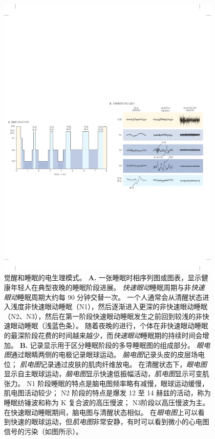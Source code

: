 \begin{figure}[htbp]
	\centering
	\includegraphics[width=1.0\linewidth]{chap44/fig_44_1}
	\caption{觉醒和睡眠的电生理模式。
		\textbf{A.} 一张睡眠时相序列图或图表，显示健康年轻人在典型夜晚的睡眠阶段进展。
		\textit{快速眼动}睡眠周期与非\textit{快速眼动}睡眠周期大约每 90 分钟交替一次。
		一个人通常会从清醒状态进入浅度非快速眼动睡眠（N1），然后逐渐进入更深的非快速眼动睡眠（N2、N3），然后在第一阶段快速眼动睡眠发生之前回到较浅的非快速眼动睡眠（浅蓝色条）。
		随着夜晚的进行，个体在非快速眼动睡眠的最深阶段花费的时间越来越少，而\textit{快速眼动}睡眠期的持续时间会增加。
		\textbf{B.} 记录显示用于区分睡眠阶段的多导睡眠图的组成部分。
		\textit{眼电图}通过眼睛两侧的电极记录眼球运动。
		\textit{脑电图}记录头皮的皮层场电位； \textit{肌电图}记录通过皮肤的肌肉纤维放电。
		在清醒状态下，\textit{眼电图}显示自主眼球运动，\textit{脑电图}显示快速低振幅活动，\textit{肌电图}显示可变肌张力。
		N1 阶段睡眠的特点是脑电图频率略有减慢，眼球运动缓慢，肌电图活动较少；
		N2 阶段的特点是爆发 12 至 14 赫兹的活动，称为睡眠纺锤波和称为 K 复合波的高压慢波；
		N3阶段以高压慢波为主。
		在快速眼动睡眠期间，脑电图与清醒状态相似。
		在\textit{眼电图}上可以看到快速的眼球运动，但\textit{肌电图}非常安静，有时可以看到微小的心电图信号的污染（如图所示）。}
	\label{fig:44_1}
\end{figure}


